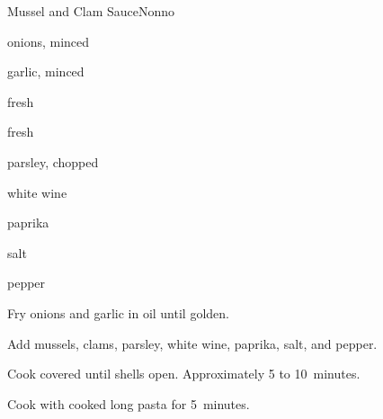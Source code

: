 \begin{recipe}{Mussel and Clam Sauce\FIXME}{Nonno}{}

\begin{ingredients}
\item onions, minced
\item garlic, minced
\item fresh 
\item fresh 
\item parsley, chopped
\item white wine
\item paprika
\item salt
\item pepper
\end{ingredients}

\begin{directions}
\item Fry onions and garlic in oil until golden.
\item Add mussels, clams, parsley, white wine, paprika, salt, and pepper.
\item Cook covered until shells open. Approximately 5 to 10~minutes.
\item Cook with cooked long pasta for 5~minutes.
\end{directions}

\end{recipe}
